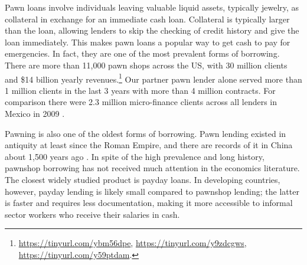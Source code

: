 \documentclass[oneside,11pt]{article}
\begin{document}
Pawn loans involve individuals leaving valuable liquid assets, typically jewelry, as collateral in exchange for an immediate cash loan. Collateral is typically larger than the loan, allowing lenders to skip the checking of credit history and give the loan immediately. This makes pawn loans a popular way to get cash to pay for emergencies. In fact, they are one of the most prevalent forms of borrowing. There are more than 11,000 pawn shops across the US, with 30 million clients and \$14 billion yearly revenues.\footnote{\url{https://tinyurl.com/ybm56dpe}, \url{https://tinyurl.com/y9zdcgws}, \url{https://tinyurl.com/y59ptdam}.} Our partner pawn lender alone served more than 1 million clients in the last 3 years with more than 4 million contracts. For comparison there were 2.3 million micro-finance clients across all lenders in Mexico in 2009 \citep{Pedroza:2010}. 

Pawning is also one of the oldest forms of borrowing. Pawn lending existed in antiquity at least since the Roman Empire, and there are records of it in China about 1,500 years ago \citep{PawnShops}. In spite of the high prevalence and long history, pawnshop borrowing has not received much attention in the economics literature. The closest widely studied product is payday loans. In developing countries, however, payday lending is likely small compared to pawnshop lending; the latter is faster and requires less documentation, making it more accessible to informal sector workers who receive their salaries in cash. %

\end{document}
